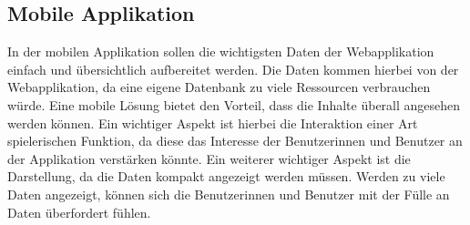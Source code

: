 \subsection{Mobile Applikation}
In der mobilen Applikation sollen die wichtigsten Daten der Webapplikation einfach und übersichtlich aufbereitet werden. Die Daten kommen hierbei von der Webapplikation, da eine eigene Datenbank zu viele Ressourcen verbrauchen würde. Eine mobile Lösung bietet den Vorteil, dass die Inhalte überall angesehen werden können. Ein wichtiger Aspekt ist hierbei die Interaktion einer Art spielerischen Funktion, da diese das Interesse der Benutzerinnen und Benutzer an der Applikation verstärken könnte. Ein weiterer wichtiger Aspekt ist die Darstellung, da die Daten kompakt angezeigt werden müssen. Werden zu viele Daten angezeigt, können sich die Benutzerinnen und Benutzer mit der Fülle an Daten überfordert fühlen. 


